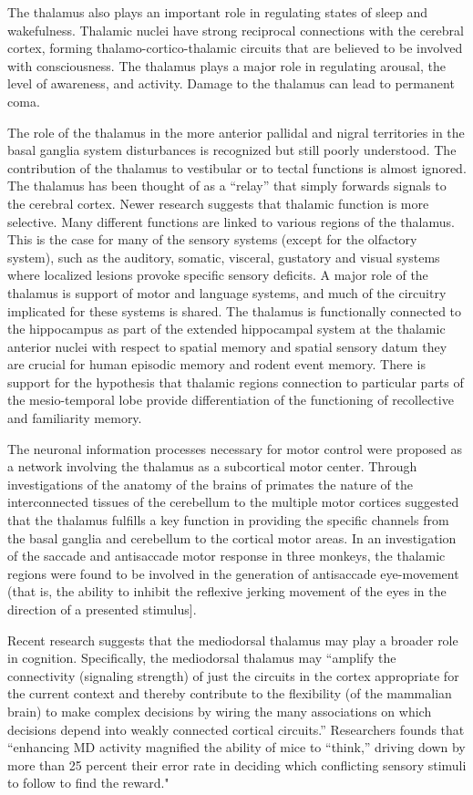 \documentclass[]{book}
\begin{document}
The thalamus also plays an important role in regulating states of sleep and wakefulness. Thalamic nuclei have strong reciprocal connections with the cerebral cortex, forming thalamo-cortico-thalamic circuits that are believed to be involved with consciousness. The thalamus plays a major role in regulating arousal, the level of awareness, and activity. Damage to the thalamus can lead to permanent coma.

The role of the thalamus in the more anterior pallidal and nigral territories in the basal ganglia system disturbances is recognized but still poorly understood. The contribution of the thalamus to vestibular or to tectal functions is almost ignored. The thalamus has been thought of as a ``relay'' that simply forwards signals to the cerebral cortex. Newer research suggests that thalamic function is more selective. Many different functions are linked to various regions of the thalamus. This is the case for many of the sensory systems (except for the olfactory system), such as the auditory, somatic, visceral, gustatory and visual systems where localized lesions provoke specific sensory deficits. A major role of the thalamus is support of motor and language systems, and much of the circuitry implicated for these systems is shared. The thalamus is functionally connected to the hippocampus as part of the extended hippocampal system at the thalamic anterior nuclei with respect to spatial memory and spatial sensory datum they are crucial for human episodic memory and rodent event memory. There is support for the hypothesis that thalamic regions connection to particular parts of the mesio-temporal lobe provide differentiation of the functioning of recollective and familiarity memory.

The neuronal information processes necessary for motor control were proposed as a network involving the thalamus as a subcortical motor center. Through investigations of the anatomy of the brains of primates the nature of the interconnected tissues of the cerebellum to the multiple motor cortices suggested that the thalamus fulfills a key function in providing the specific channels from the basal ganglia and cerebellum to the cortical motor areas. In an investigation of the saccade and antisaccade motor response in three monkeys, the thalamic regions were found to be involved in the generation of antisaccade eye-movement (that is, the ability to inhibit the reflexive jerking movement of the eyes in the direction of a presented stimulus{]}.

Recent research suggests that the mediodorsal thalamus may play a broader role in cognition. Specifically, the mediodorsal thalamus may ``amplify the connectivity (signaling strength) of just the circuits in the cortex appropriate for the current context and thereby contribute to the flexibility (of the mammalian brain) to make complex decisions by wiring the many associations on which decisions depend into weakly connected cortical circuits.'' Researchers founds that ``enhancing MD activity magnified the ability of mice to ``think,'' driving down by more than 25 percent their error rate in deciding which conflicting sensory stimuli to follow to find the reward."
\end{document}
